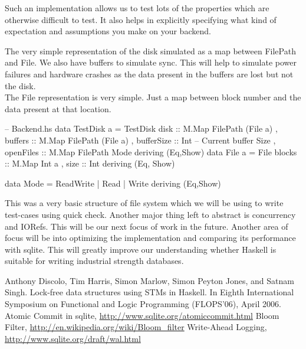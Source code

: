 \documentclass[11pt,a4paper]{article}
\begin{document}
Such an implementation allows us to test lots of the properties which are otherwise difficult to test. It also helps in explicitly specifying what kind of expectation and assumptions you make on your backend.

The very simple representation of the disk simulated as a map between FilePath and File. 
We also have buffers to simulate sync. This will help to simulate power failures and hardware crashes as the data present in the buffers are lost but not the disk. \\
The File representation is very simple. Just a map between block number and the data present at that location.

\begin{code}[name=Backend]
-- Backend.hs
data TestDisk a = TestDisk {
    disk :: M.Map FilePath (File a)
   , buffers :: M.Map FilePath (File a) 
   , bufferSize :: Int -- Current buffer Size 
   , openFiles :: M.Map FilePath Mode
    } deriving (Eq,Show)
data File a = File {
    blocks :: M.Map Int a 
   , size :: Int 
    } deriving (Eq, Show)

data Mode = ReadWrite | Read | Write deriving (Eq,Show) 
\end{code}

This was a very basic structure of file system which we will be using to write test-cases using quick check. Another major thing left to abstract is concurrency and IORefs. This will be our next focus of work in the future. Another area of focus will be into optimizing the implementation and comparing its performance with sqlite. This will greatly improve our understanding whether Haskell is suitable for writing industrial strength databases. 



\begin{thebibliography}{10}
Anthony Discolo, Tim Harris, Simon Marlow, Simon Peyton Jones, and Satnam Singh. Lock-free data structures using STMs in Haskell. In Eighth International Symposium on Functional and Logic Programming (FLOPS’06), April 2006.
Atomic Commit in sqlite, \url{http://www.sqlite.org/atomiccommit.html}
Bloom Filter, \url{http://en.wikipedia.org/wiki/Bloom_filter}
Write-Ahead Logging, \url{http://www.sqlite.org/draft/wal.html}
\end{thebibliography}

\pagebreak
\end{document}
